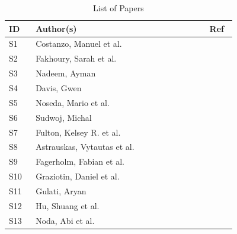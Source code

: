 \documentclass[conference]{IEEEtran}
\begin{document}
\begin{table}[!htbp]
    \caption{List of Papers}
    \label{tab:primary_papers}
    \centering
    \def\arraystretch{1.3}
    \begin{tabular}{p{0.1\linewidth}p{0.65\linewidth}p{0.1\linewidth}}
        \hline
        ID  & Author(s)                            & Ref                                                        \\
        \hline
        \hline
        S1  & Costanzo, Manuel et al.              & \cite{costanzoPerformanceVsProgramming2021}                \\
        \hline
        S2  & Fakhoury, Sarah et al.               & \cite{fakhouryEffectPoorSource2018}                        \\
        \hline
        S3  & Nadeem, Ayman                        & \cite{nadeemHumancenteredApproachStaticanalysisdriven2022} \\
        \hline
        S4  & Davis, Gwen                          & \cite{davisDeveloperExperienceWhat2023}                    \\
        \hline
        S5  & Noseda, Mario et al.                 & \cite{nosedaRustSecureIoT2022}                             \\
        \hline
        S6  & Sudwoj, Michal                       & \cite{sudwojRustProgrammingLanguage2020}                   \\
        \hline
        S7  & Fulton, Kelsey R. et al.             & \cite{fultonBenefitsDrawbacksAdopting2021}                 \\
        \hline
        S8  & Astrauskas, Vytautas et al.          & \cite{astrauskasHowProgrammersUse2020}                     \\
        \hline
        S9  & Fagerholm, Fabian et al.             & \cite{fagerholmDeveloperExperienceConcept2012}             \\
        \hline
        S10 & Graziotin, Daniel et al.             & \cite{graziotin2015you}                                    \\
        \hline
        S11 & Gulati, Aryan                        & \cite{gulati2022can}                                       \\
        \hline
        S12 & Hu, Shuang et al.                    & \cite{huComprehensivenessAutomationLifecycle2022}          \\
        \hline
        S13 & Noda, Abi et al.                     & \cite{nodaDevExWhatActually2023}                           \\

\end{tabular}
\end{table}
\end{document}
